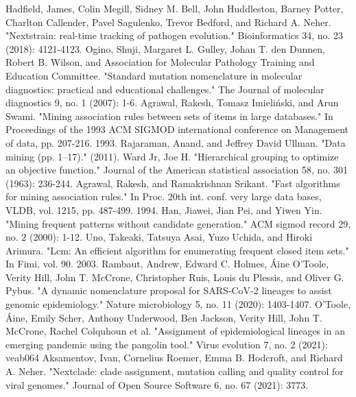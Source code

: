\documentclass[twoside,twocolumn]{article}
\begin{document}
	\begin{thebibliography}{99} 
		Hadfield, James, Colin Megill, Sidney M. Bell, John Huddleston, Barney Potter, Charlton Callender, Pavel Sagulenko, Trevor Bedford, and Richard A. Neher. "Nextstrain: real-time tracking of pathogen evolution." Bioinformatics 34, no. 23 (2018): 4121-4123.
		Ogino, Shuji, Margaret L. Gulley, Johan T. den Dunnen, Robert B. Wilson, and Association for Molecular Pathology Training and Education Committee. "Standard mutation nomenclature in molecular diagnostics: practical and educational challenges." The Journal of molecular diagnostics 9, no. 1 (2007): 1-6.
		Agrawal, Rakesh, Tomasz Imieliński, and Arun Swami. "Mining association rules between sets of items in large databases." In Proceedings of the 1993 ACM SIGMOD international conference on Management of data, pp. 207-216. 1993.
		Rajaraman, Anand, and Jeffrey David Ullman. "Data mining (pp. 1–17)." (2011).
		Ward Jr, Joe H. "Hierarchical grouping to optimize an objective function." Journal of the American statistical association 58, no. 301 (1963): 236-244.
		Agrawal, Rakesh, and Ramakrishnan Srikant. "Fast algorithms for mining association rules." In Proc. 20th int. conf. very large data bases, VLDB, vol. 1215, pp. 487-499. 1994.
		Han, Jiawei, Jian Pei, and Yiwen Yin. "Mining frequent patterns without candidate generation." ACM sigmod record 29, no. 2 (2000): 1-12.
		Uno, Takeaki, Tatsuya Asai, Yuzo Uchida, and Hiroki Arimura. "Lcm: An efficient algorithm for enumerating frequent closed item sets." In Fimi, vol. 90. 2003.
		Rambaut, Andrew, Edward C. Holmes, Áine O’Toole, Verity Hill, John T. McCrone, Christopher Ruis, Louis du Plessis, and Oliver G. Pybus. "A dynamic nomenclature proposal for SARS-CoV-2 lineages to assist genomic epidemiology." Nature microbiology 5, no. 11 (2020): 1403-1407.
		O’Toole, Áine, Emily Scher, Anthony Underwood, Ben Jackson, Verity Hill, John T. McCrone, Rachel Colquhoun et al. "Assignment of epidemiological lineages in an emerging pandemic using the pangolin tool." Virus evolution 7, no. 2 (2021): veab064
		Aksamentov, Ivan, Cornelius Roemer, Emma B. Hodcroft, and Richard A. Neher. "Nextclade: clade assignment, mutation calling and quality control for viral genomes." Journal of Open Source Software 6, no. 67 (2021): 3773.
		
	\end{thebibliography}
	
	
\end{document}

